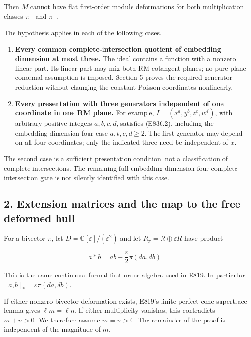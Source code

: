 Then \(M\) cannot have flat first-order module deformations for both
multiplication classes \(\pi_+\) and \(\pi_-\).

The hypothesis applies in each of the following cases.

\begin{enumerate}
\def\labelenumi{\arabic{enumi}.}
\item
  \textbf{Every common complete-intersection quotient of embedding
  dimension at most three.} The ideal contains a function with a nonzero
  linear part. Its linear part may mix both RM cotangent planes; no
  pure-plane conormal assumption is imposed. Section 5 proves the
  required generator reduction without changing the constant Poisson
  coordinates nonlinearly.
\item
  \textbf{Every presentation with three generators independent of one
  coordinate in one RM plane.} For example, \(I=(x^a,y^b,z^c,w^d)\),
  with arbitrary positive integers \(a,b,c,d\), satisfies (E836.2),
  including the embedding-dimension-four case \(a,b,c,d\ge2\). The first
  generator may depend on all four coordinates; only the indicated three
  need be independent of \(x\).
\end{enumerate}

The second case is a sufficient presentation condition, not a
classification of complete intersections. The remaining
full-embedding-dimension-four complete-intersection gate is not silently
identified with this case.

\subsection{2. Extension matrices and the map to the free deformed
hull}\label{SF-E836:extension-matrices-and-the-map-to-the-free-deformed-hull}

For a bivector \(\pi\), let \(D=\mathbb C[\varepsilon]/(\varepsilon^2)\)
and let \(R_\pi=R\oplus\varepsilon R\) have product

\[
 a*b=ab+\frac{\varepsilon}{2}\pi(da,db).
 \tag{E836.4}
\]

This is the same continuous formal first-order algebra used in E819. In
particular \([a,b]_* =\varepsilon\pi(da,db)\).

If either nonzero bivector deformation exists, E819's
finite-perfect-cone supertrace lemma gives \(\ell m=\ell n\). If either
multiplicity vanishes, this contradicts \(m+n>0\). We therefore assume
\(m=n>0\). The remainder of the proof is independent of the magnitude of
\(m\).

